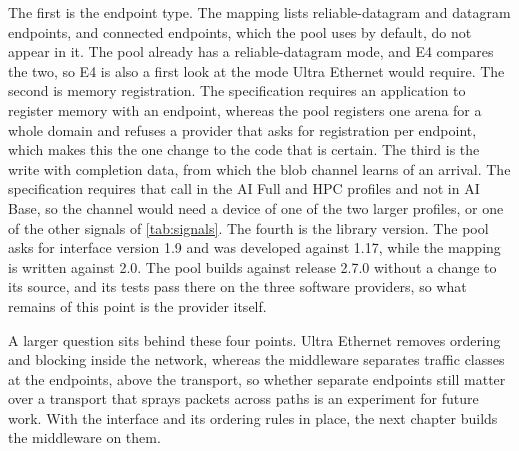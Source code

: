 The first is the endpoint type. The mapping lists reliable-datagram and
datagram endpoints, and connected endpoints, which the pool uses by default,
do not appear in it. The pool already has a reliable-datagram mode, and E4
compares the two, so E4 is also a first look at the mode Ultra Ethernet would
require. The second is memory registration. The specification requires an
application to register memory with an endpoint, whereas the pool registers
one arena for a whole domain and refuses a provider that asks for
registration per endpoint, which makes this the one change to the code that
is certain. The third is the write with completion data, from which the blob
channel learns of an arrival. The specification requires that call in the AI
Full and HPC profiles and not in AI Base, so the channel would need a device
of one of the two larger profiles, or one of the other signals of
\cref{tab:signals}. The fourth is the library version. The pool asks for
interface version 1.9 and was developed against 1.17, while the mapping is
written against 2.0. The pool builds against release 2.7.0 without a change
to its source, and its tests pass there on the three software providers, so
what remains of this point is the provider itself.

A larger question sits behind these four points. Ultra Ethernet removes ordering and
blocking inside the network, whereas the middleware separates traffic classes
at the endpoints, above the transport, so whether separate endpoints still
matter over a transport that sprays packets across paths is an experiment
for future work. With the interface and its ordering rules in place, the next chapter builds the middleware on them.
